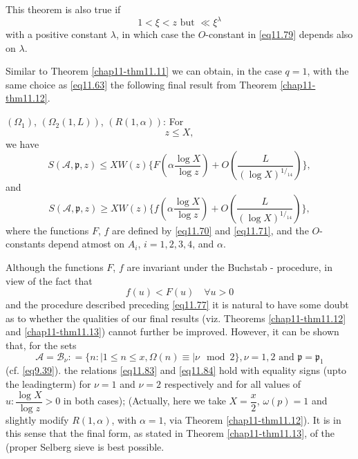 This theorem is also true if
\begin{equation*}
1< \xi < z \text { but } \ll \xi ^ \lambda \tag{11.81}\label{eq11.81}
\end{equation*}
with a positive constant $\lambda$, in which case the $O$-constant
in \eqref{eq11.79} depends also on $\lambda$. 

Similar to Theorem \ref{chap11-thm11.11} we can obtain, in the case
$q=1$, with the same choice as \eqref{eq11.63} the following final
result from Theorem \ref{chap11-thm11.12}. 

\begin{theorem}\label{chap11-thm11.13}
$(\Omega_1)$, $(\Omega_2(1,L))$, $(R(1, \alpha))$:  For
\begin{equation*}
z\leq X, \tag{11.82}\label{eq11.82}
\end{equation*}
we have 
\begin{equation*}
S (\mathscr{A},\mathfrak{p} , z) \leq X W (z) \bigg\{ F (\alpha \frac
{\log X}{\log z}) + O  (\frac{L}{(\log X)^{1/_{14}}})\bigg\},
\tag{11.83}\label{eq11.83} 
\end{equation*}
and
\begin{equation*}
S( \mathscr{A}, \mathfrak{p},  z) \ge X W (z) \bigg\{ f (\alpha \frac
{\log X}{\log z}) + O (\frac{L}{(\log X)^{1/_{14}}})\bigg\},
\tag{11.84}\label{eq11.84} 
\end{equation*}
where the functions $F$, $f$ are defined by \eqref{eq11.70} and
\eqref{eq11.71}, and the $O$-constants depend atmost on $A_i$,
$i=1,2,3,4$, and $\alpha$.  
\end{theorem}

Although the functions $F$, $f$ are invariant under the
Buchstab - procedure, in view of the fact that 
\begin{equation*}
f(u)<F(u) \quad \forall u>0 \tag{11.85}\label{eq11.85}
\end{equation*} 
and the procedure  described preceding \eqref{eq11.77} it is natural to have
some doubt as to whether the qualities of our final results
(viz. Theorems \ref{chap11-thm11.12} and \ref{chap11-thm11.13}) cannot
further be improved. However, it can be shown that, for the sets 
\begin{equation*}
\mathscr{A}= \mathscr{B}_\nu : = \bigg\{ n: | 1 \leq n \leq x,
\Omega(n) \equiv
| \nu \mod  2 \bigg\}, \nu =1,2 \text{ and } \mathfrak{p} =
\mathfrak{p}_1 \tag{11.86}\label{eq11.86} 
 \end{equation*} 
(cf. \eqref{eq9.39}). the relations \eqref{eq11.83} and
\eqref{eq11.84} hold with equality signs (upto the
leading\pageoriginale term) for $\nu = 1$ and $\nu=2$ respectively and
for all values of $u:\dfrac{\log X}{\log z}> 0$ in both  cases);
(Actually, here we take $X=\dfrac{x}{2}$, $\omega(p)=1$ and slightly
modify $R(1, \alpha)$, with $\alpha=1$, via Theorem
\ref{chap11-thm11.12}). It is in this sense that the final form, as
stated in Theorem \ref{chap11-thm11.13}, of the (proper Selberg sieve
is best possible. 

